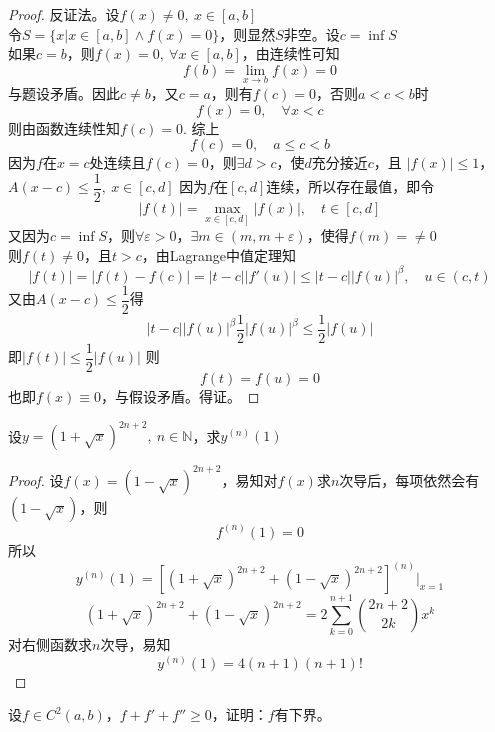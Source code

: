 \begin{proof}

    反证法。设$f(x) \neq 0,\ x \in [a,b]$\\
    令$S = \{x | x \in [a,b] \land f(x) = 0\}$，则显然$S$非空。设$ c = \inf{S}$\\
    如果$c= b$，则$f(x) = 0, \ \forall x \in [a,b]$，由连续性可知
    $$f(b) = \lim_{x\to b}{f(x)} = 0$$
    与题设矛盾。因此$c \neq b$，又$c =a $，则有$f(c) = 0$，否则$a<c<b$时
    $$f(x) = 0, \quad \forall x < c$$
    则由函数连续性知$f(c) = 0$. 综上
    $$f(c) = 0, \quad a \leq c < b$$
    因为$f$在$x = c$处连续且$f(c) = 0$，则$\exists d > c$，使$d$充分接近$c$，且
    $|f(x)| \leq 1$，$A(x - c) \leq \dfrac{1}{2}, \ x \in [c,d]$
    因为$f$在$[c,d]$连续，所以存在最值，即令
    $$ |f(t)| = \max_{x\in[c,d]}{|f(x)|}, \quad t \in [c,d]$$
    又因为$c = \inf{S}$，则$\forall \varepsilon > 0$，$\exists m \in (m, m+\varepsilon)$，使得$f(m) = \neq 0$\\
    则$f(t) \neq 0$，且$t > c$，由\textup{Lagrange}中值定理知
    $$| f(t)| = |f(t) - f(c)| = |t-c||f'(u)| \leq |t-c||f(u)|^{\beta}, \quad u \in (c,t)$$
    又由$A(x-c) \leq \dfrac{1}{2}$得
    $$|t-c||f(u)|^{\beta} \dfrac{1}{2}|f(u)|^{\beta} \leq \dfrac{1}{2} |f(u)|$$
    即$|f(t)| \leq \dfrac{1}{2}|f(u)|$
    则
    $$f(t) = f(u) = 0$$
    也即$f(x) \equiv 0$，与假设矛盾。得证。

\end{proof}

\begin{proposition}
    
    设$y = (1 + \sqrt{x})^{2n+2},\ n \in \mathbb{N}$，求$y^{(n)}(1)$

\end{proposition}

\begin{proof}

    设$f(x) = (1 - \sqrt{x})^{2n+2}$，易知对$f(x)$求$n$次导后，每项依然会有$(1 - \sqrt{x})$，则
    $$f^{(n)}(1) = 0$$
    所以
    $$y^{(n)}(1) = \left[(1 + \sqrt{x})^{2n+2} + (1 - \sqrt{x})^{2n+2}\right]^{(n)}\big|_{x=1}$$
    $$ (1 + \sqrt{x})^{2n+2} + (1 - \sqrt{x})^{2n+2} = 2 \sum_{k=0}^{n+1}{\binom{2n+2}{2k}x^k}$$
    对右侧函数求$n$次导，易知
    $$y^{(n)}(1) = 4(n+1)(n+1)!$$

\end{proof}

\begin{proposition}
    
    设$f \in C^2(a,b)$，$f + f' + f'' \geq 0$，证明：$f$有下界。

\end{proposition}

